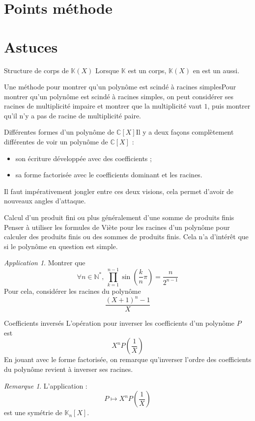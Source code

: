 \documentclass[french]{book}
\newcommand{\N}{\mathbb{N}}
\newcommand{\C}{\mathbb{C}}
\newcommand{\K}{\mathbb{K}}
\newcommand{\st}{^*}
\theoremstyle{plain}
\theoremstyle{definition}
\theoremstyle{remark}
\newtheorem*{rmq}{Remarque}
\newtheorem*{app}{Application}
\begin{document}
\section{Points méthode}
\section{Astuces}
\begin{AS}{Structure de corps de $\K(X)$} Lorsque $\K$ est un corps, $\K(X)$ en est un aussi.
\end{AS} 
\begin{AS}{Une méthode pour montrer qu'un polynôme est scindé à racines simples}Pour montrer qu’un polynôme est scindé à racines simples, on peut considérer ses racines de multiplicité impaire et montrer que la multiplicité vaut $1$, puis montrer qu'il n'y a pas de racine de multiplicité paire.
\end{AS}
\begin{AS}{Différentes formes d'un polynôme de $\C[X]$}Il y a deux façons complètement différentes de voir un polynôme de $\C[X]$ :
\begin{itemize}
	\item son écriture développée avec des coefficients ;
	\item sa forme factorisée avec le coefficients dominant et les racines.
\end{itemize}
Il faut impérativement jongler entre ces deux visions, cela permet d'avoir de nouveaux angles d'attaque.
\end{AS}
\begin{AS}{Calcul d'un produit fini ou plus généralement d'une somme de produits finis} Penser à utiliser les formules de Viète pour les racines d'un polynôme pour calculer des produits finis ou des sommes de produits finis. Cela n'a d'intérêt que si le polynôme en question est simple.
\end{AS}
\begin{app}
	Montrer que $$\forall n\in\N\st,\ \prod_{k=1}^{n-1}\sin\left(\frac{k}{n}\pi\right)=\frac{n}{2^{n-1}}$$ Pour cela, considérer les racines du polynôme $$\frac{(X+1)^n-1}{X}$$
\end{app}
\begin{AS}{Coefficients inversés} L'opération pour inverser les coefficients d'un polynôme $P$ est $$X^nP\left(\frac{1}{X}\right)$$ En jouant avec le forme factorisée, on remarque qu'inverser l'ordre des coefficients du polynôme revient à inverser ses racines.
\end{AS}
\begin{rmq}
	L'application : $$P\mapsto X^nP\left(\frac{1}{X}\right)$$ est une symétrie de $\K_n[X]$.
\end{rmq}
\end{document}
